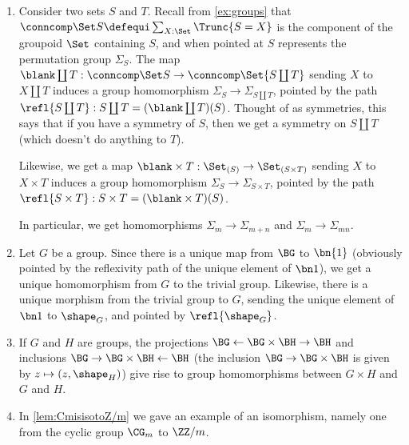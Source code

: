 \begin{example}%
  \label{ex:groups-morphisms}%
  \leavevmode
  \begin{enumerate}
  \item Consider two sets $S$ and $T$.  Recall from \cref{ex:groups}
    that $\conncomp \Set S \defequi\sum_{X:\Set}\Trunc{S=X}$ is the component
    of the groupoid $\Set$ containing $S$, and when pointed at $S$
    represents the permutation group $\Sigma_S$.  The map
    $\blank\coprod T:\conncomp \Set S \to \conncomp \Set {S\coprod T}$ sending $X$ to $X\coprod T$
    induces a group homomorphism $\Sigma_S\to\Sigma_{S\coprod T}$,
    pointed by the path $\refl {S\coprod T}:S\coprod T = (\blank\coprod T)(S)$.
    Thought of as symmetries, this says that if you have a symmetry of
    $S$, then we get a symmetry on $S\coprod T$ (which doesn't do
    anything to $T$).

    Likewise, we get a map
    $\blank\times T:\Set_{(S)}\to\Set_{(S\times T)}$ sending $X$ to
    $X\times T$ induces a group homomorphism
    $\Sigma_S\to\Sigma_{S\times T}$, pointed by the path
    $\refl {S\times T}: {S\times T} = (\blank \times T)(S)$.

In particular, we get homomorphisms $\Sigma_m\to\Sigma_{m+n}$ and $\Sigma_m\to\Sigma_{mn}$.
\item Let $G$ be a group.  Since there is a unique map from $\BG$ to
  $\bn{1} $ (obviously pointed by the reflexivity path of the unique
  element of $\bn 1$), we get a unique homomorphism from $G$ to the
  trivial group.  Likewise, there is a unique morphism from the
  trivial group to $G$, sending the unique element of $\bn 1$ to
  $\shape_G$, and pointed by $\refl {\shape_G}$.
\item If $G$ and $H$ are groups, the projections $\BG\gets \BG\times \BH\to \BH$ and inclusions $\BG\to\BG\times\BH\gets\BH$ 
  (\eg the inclusion $\BG\to\BG\times\BH$ is given by $z\mapsto(z,\shape_H)$) give rise to group homomorphisms between $G\times H$ and $G$ and $H$.
\item In \cref{lem:CmisisotoZ/m} we gave an example of an isomorphism, namely one from the cyclic group $\CG_m$ to $\ZZ/m$.\qedhere
  \end{enumerate}
\end{example}

